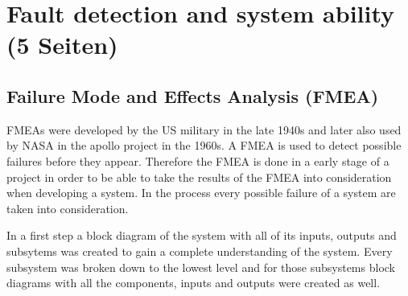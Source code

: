 \documentclass[ExampleMasters.tex]{subfiles}
\begin{document}
\clearpage


\chapter{Fault detection and system ability (5 Seiten)}
\label{chap:fault_detection}
\section{Failure Mode and Effects Analysis (FMEA)}
\label{sec:FMEA}
FMEAs were developed by the US military in the late 1940s and later also used by NASA in the apollo project in the 1960s.
A FMEA is used to detect possible failures before they appear. Therefore the FMEA is done in a early stage of a project in order to be able to take the results of the FMEA into consideration when developing a system. In the process every possible failure of a system are taken into consideration. 

In a first step a block diagram of the system with all of its inputs, outputs and subsytems was created to gain a complete understanding of the system. Every subsystem was broken down to the lowest level and for those subsystems block diagrams with all the components, inputs and outputs were created as well.
\end{document}
